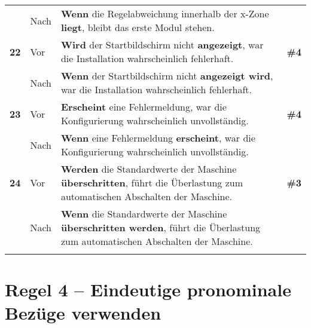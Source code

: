 \begin{longtable}{llp{}l}
& Nach & \textbf{Wenn} die Regelabweichung innerhalb der x-Zone \textbf{liegt}, bleibt das erste Modul stehen. & \\
\tablevspace
{ \textbf{22}} & Vor & \textbf{Wird} der Startbildschirm nicht \textbf{angezeigt}, war die Installation wahrscheinlich fehlerhaft. & \textbf{\#4}\\
& Nach & \textbf{Wenn} der Startbildschirm nicht \textbf{angezeigt wird}, war die Installation wahrscheinlich fehlerhaft. & \\
\tablevspace
{ \textbf{23}} & Vor & \textbf{Erscheint} eine Fehlermeldung, war die Konfigurierung wahrscheinlich unvollständig. & \textbf{\#4}\\
& Nach & \textbf{Wenn} eine Fehlermeldung \textbf{erscheint}, war die Konfigurierung wahrscheinlich unvollständig. & \\
\tablevspace
{ \textbf{24}} & Vor & \textbf{Werden} die Standardwerte der Maschine \textbf{überschritten}, führt die Überlastung zum automatischen Abschalten der Maschine. & \textbf{\#3}\\
& Nach & \textbf{Wenn} die Standardwerte der Maschine \textbf{überschritten werden}, führt die Überlastung zum automatischen Abschalten der Maschine. & \\
\lspbottomrule
\end{longtable}

\section*{Regel 4 -- Eindeutige pronominale Bezüge verwenden}


